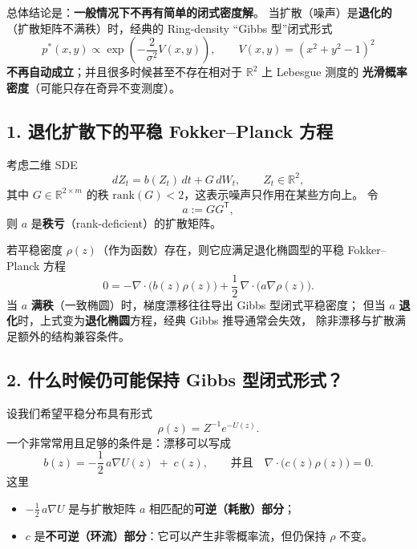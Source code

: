 	总体结论是：\textbf{一般情况下不再有简单的闭式密度解}。
	当扩散（噪声）是\textbf{退化的}（扩散矩阵不满秩）时，经典的 Ring-density ``Gibbs 型''闭式形式
	\[
	p^*(x,y)\propto \exp\!\left(-\frac{2}{\sigma^2}V(x,y)\right),
	\qquad V(x,y)=(x^2+y^2-1)^2
	\]
	\textbf{不再自动成立}；并且很多时候甚至不存在相对于 $\mathbb{R}^2$ 上 Lebesgue 测度的
	\textbf{光滑概率密度}（可能只存在奇异不变测度）。
	
	\subsection{1. 退化扩散下的平稳 Fokker--Planck 方程}
	
	考虑二维 SDE
	\begin{equation}\label{eq:deg_sde}
		dZ_t=b(Z_t)\,dt + G\,dW_t,\qquad Z_t\in\mathbb{R}^2,
	\end{equation}
	其中 $G\in\mathbb{R}^{2\times m}$ 的秩 $\mathrm{rank}(G)<2$，这表示噪声只作用在某些方向上。
	令
	\[
	a:=GG^{\mathsf T},
	\]
	则 $a$ 是\textbf{秩亏}（rank-deficient）的扩散矩阵。
	
	若平稳密度 $\rho(z)$（作为函数）存在，则它应满足退化椭圆型的平稳 Fokker--Planck 方程
	\begin{equation}\label{eq:deg_FP}
		0=-\nabla\cdot\big(b(z)\rho(z)\big)
		+\frac12\,\nabla\cdot\big(a\nabla\rho(z)\big).
	\end{equation}
	当 $a$ \textbf{满秩}（一致椭圆）时，梯度漂移往往导出 Gibbs 型闭式平稳密度；
	但当 $a$ \textbf{退化}时，上式变为\textbf{退化椭圆}方程，经典 Gibbs 推导通常会失效，
	除非漂移与扩散满足额外的结构兼容条件。
	
	\subsection{2. 什么时候仍可能保持 Gibbs 型闭式形式？}
	
	设我们希望平稳分布具有形式
	\[
	\rho(z)=Z^{-1}e^{-U(z)}.
	\]
	一个非常常用且足够的条件是：漂移可以写成
	\begin{equation}\label{eq:structure}
		b(z)= -\frac12\,a\nabla U(z) \;+\; c(z),
		\qquad \text{并且}\quad \nabla\cdot\big(c(z)\rho(z)\big)=0.
	\end{equation}
	这里
	\begin{itemize}
		\item $-\frac12\,a\nabla U$ 是与扩散矩阵 $a$ 相匹配的\textbf{可逆（耗散）部分}；
		\item $c$ 是\textbf{不可逆（环流）部分}：它可以产生非零概率流，但仍保持 $\rho$ 不变。
	\end{itemize}
	
